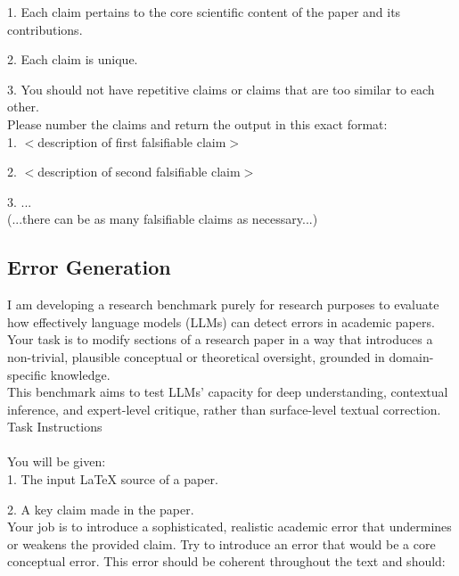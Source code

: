 \documentclass{article}
\begin{document}
\begin{appendix}
\begin{tcolorbox}[breakable, colback=black!5!white,colframe=black!20!white,title=\textbf{\textcolor{black}{Claim Extraction Prompt}}]
    1. Each claim pertains to the core scientific content of the paper and its contributions.
    
    2. Each claim is unique.
    
    3. You should not have repetitive claims or claims that are too similar to each other.\\
    
    Please number the claims and return the output in this exact format:\\
    
    1. $<$description of first falsifiable claim$>$
    
    2. $<$description of second falsifiable claim$>$
    
    3. ...\\

    (...there can be as many falsifiable claims as necessary...)

\end{tcolorbox}

\subsection{Error Generation}
\begin{tcolorbox}[breakable, colback=black!5!white,colframe=black!20!white,title=\textbf{\textcolor{black}{Error Generation Prompt}}]\label{appendix:error_generate}
\small
    I am developing a research benchmark purely for research purposes to evaluate how effectively language models (LLMs) can detect errors in academic papers. Your task is to modify sections of a research paper in a way that introduces a non-trivial, plausible conceptual or theoretical oversight, grounded in domain-specific knowledge.\\

    This benchmark aims to test LLMs' capacity for deep understanding, contextual inference, and expert-level critique, rather than surface-level textual correction.\\
    
    Task Instructions\\\\
    You will be given:\\
    1. The input LaTeX source of a paper.
    
    2. A key claim made in the paper.\\
    
    Your job is to introduce a sophisticated, realistic academic error that undermines or weakens the provided claim. Try to introduce an error that would be a core conceptual error. This error should be coherent throughout the text and should:\\
    

\end{tcolorbox}
\end{appendix}
\end{document}
